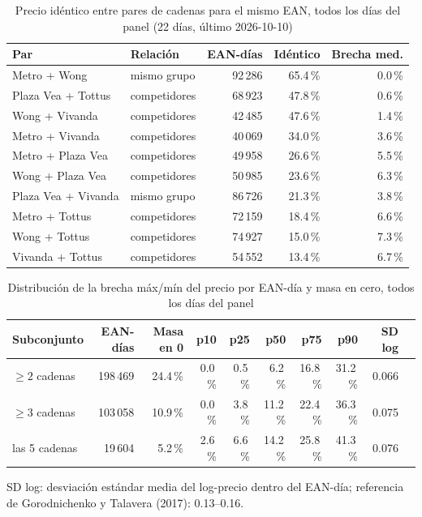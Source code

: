 
\begin{table}[htbp]
\caption{Precio id\'entico entre pares de cadenas para el mismo EAN, todos los d\'ias del panel (22 d\'ias, \'ultimo 2026-10-10)}
\label{tab:identidad}
\centering\scriptsize\setlength{\tabcolsep}{3pt}
\begin{tabular}{@{}llrrr@{}}
\toprule
Par & Relaci\'on & EAN-d\'ias & Id\'entico & Brecha med. \\
\midrule
Metro + Wong & mismo grupo & 92\,286 & 65.4\,\% & 0.0\,\% \\
Plaza Vea + Tottus & competidores & 68\,923 & 47.8\,\% & 0.6\,\% \\
Wong + Vivanda & competidores & 42\,485 & 47.6\,\% & 1.4\,\% \\
Metro + Vivanda & competidores & 40\,069 & 34.0\,\% & 3.6\,\% \\
Metro + Plaza Vea & competidores & 49\,958 & 26.6\,\% & 5.5\,\% \\
Wong + Plaza Vea & competidores & 50\,985 & 23.6\,\% & 6.3\,\% \\
Plaza Vea + Vivanda & mismo grupo & 86\,726 & 21.3\,\% & 3.8\,\% \\
Metro + Tottus & competidores & 72\,159 & 18.4\,\% & 6.6\,\% \\
Wong + Tottus & competidores & 74\,927 & 15.0\,\% & 7.3\,\% \\
Vivanda + Tottus & competidores & 54\,552 & 13.4\,\% & 6.7\,\% \\
\bottomrule\end{tabular}\end{table}

\begin{table}[t]
\caption{Distribuci\'on de la brecha m\'ax/m\'in del precio por EAN-d\'ia y masa en cero, todos los d\'ias del panel}
\label{tab:brecha}
\centering\scriptsize\setlength{\tabcolsep}{4pt}
\begin{tabular}{@{}lrrrrrrrrr@{}}
\toprule
Subconjunto & EAN-d\'ias & Masa en 0 & p10 & p25 & p50 & p75 & p90 & SD log \\
\midrule
$\geq 2$ cadenas & 198\,469 & 24.4\,\% & 0.0\,\% & 0.5\,\% & 6.2\,\% & 16.8\,\% & 31.2\,\% & 0.066 \\
$\geq 3$ cadenas & 103\,058 & 10.9\,\% & 0.0\,\% & 3.8\,\% & 11.2\,\% & 22.4\,\% & 36.3\,\% & 0.075 \\
las 5 cadenas & 19\,604 & 5.2\,\% & 2.6\,\% & 6.6\,\% & 14.2\,\% & 25.8\,\% & 41.3\,\% & 0.076 \\
\bottomrule\end{tabular}
\par\smallskip\raggedright\scriptsize SD log: desviaci\'on est\'andar media del log-precio dentro del EAN-d\'ia; referencia de Gorodnichenko y Talavera (2017): 0.13--0.16.
\end{table}

